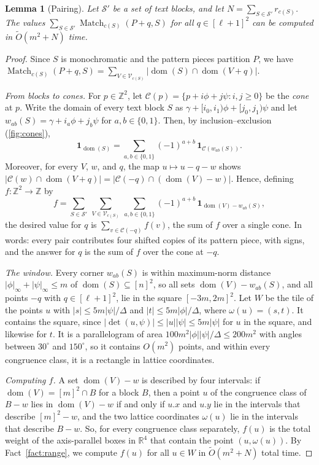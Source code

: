 \documentclass[11pt]{article}
\newtheorem{lemma}[theorem]{Lemma}
\theoremstyle{definition}
\newcommand{\Z}{\mathbb{Z}}
\newcommand{\R}{\mathbb{R}}
\newcommand{\tO}{\tilde{O}}
\renewcommand{\O}{O}
\DeclareMathOperator{\Match}{Match}
\DeclareMathOperator{\dom}{dom}
\newcommand{\cS}{\mathcal{S}}
\newcommand{\cV}{\mathcal{V}}
\newcommand{\cC}{\mathcal{C}}
\newcommand{\abs}[1]{\lvert #1 \rvert}
\newcommand{\inorm}[1]{\lvert #1 \rvert_\infty}
\newcommand{\x}[1]{#1.x}
\newcommand{\y}[1]{#1.y}
\begin{document}
\begin{lemma}[Pairing]\label{lem:pairing}
Let $\cS'$ be a set of text blocks, and let $N = \sum_{S \in \cS'} r_{c(S)}$.
The values $\sum_{S \in \cS'} \Match_{c(S)}(P + q, S)$ for all $q \in [\ell+1]^2$ can be computed in $\tO(m^2 + N)$ time.
\end{lemma}
\begin{proof}
Since $S$ is monochromatic and the pattern pieces partition $P$, we have $\Match_{c(S)}(P + q, S) = \sum_{V \in \cV_{c(S)}} \abs{\dom(S) \cap \dom(V+q)}$.

\emph{From blocks to cones.}
For $p \in \Z^2$, let $\cC(p) = \{p + i\phi + j\psi : i,j \ge 0\}$ be the \emph{cone} at $p$.
Write the domain of every text block $S$ as $\gamma + [i_0, i_1)\phi + [j_0, j_1)\psi$ and let $w_{ab}(S) = \gamma + i_a\phi + j_b\psi$ for $a,b \in \{0,1\}$.
Then, by inclusion--exclusion (\autoref{fig:cones}),
\[ \mathbf{1}_{\dom(S)} = \textstyle\sum_{a,b \in \{0,1\}} (-1)^{a+b}\,\mathbf 1_{\cC(w_{ab}(S))}. \]
Moreover, for every $V$, $w$, and $q$, the map $u \mapsto u - q - w$ shows $\abs{\cC(w) \cap \dom(V+q)} = \abs{\cC(-q) \cap (\dom(V) - w)}$.
Hence, defining $f \colon \Z^2 \to \Z$ by
\[ f = \sum_{S \in \cS'}\ \sum_{V \in \cV_{c(S)}}\ \sum_{a,b \in \{0,1\}} (-1)^{a+b}\,\mathbf{1}_{\dom(V) - w_{ab}(S)}, \]
the desired value for $q$ is $\sum_{v \in \cC(-q)} f(v)$, the sum of $f$ over a single cone.
In words: every pair contributes four shifted copies of its pattern piece, with signs, and the answer for $q$ is the sum of $f$ over the cone at $-q$.

\emph{The window.}
Every corner $w_{ab}(S)$ is within maximum-norm distance $\inorm{\phi} + \inorm{\psi} \le m$ of $\dom(S) \subseteq [n]^2$, so all sets $\dom(V) - w_{ab}(S)$, and all points $-q$ with $q \in [\ell+1]^2$, lie in the square $[-3m, 2m]^2$.
Let $W$ be the tile of the points $u$ with $\abs{s} \le 5m\abs{\psi}/\Delta$ and $\abs{t} \le 5m\abs{\phi}/\Delta$, where $\omega(u) = (s,t)$.
It contains the square, since $\abs{\det(u,\psi)} \le \abs{u}\abs{\psi} \le 5m\abs{\psi}$ for $u$ in the square, and likewise for $t$.
It is a parallelogram of area $100m^2\abs{\phi}\abs{\psi}/\Delta \le 200m^2$ with angles between $30^\circ$ and $150^\circ$, so it contains $\O(m^2)$ points, and within every congruence class, it is a rectangle in lattice coordinates.

\emph{Computing $f$.}
A set $\dom(V) - w$ is described by four intervals: if $\dom(V) = [m]^2 \cap B$ for a block $B$, then a point $u$ of the congruence class of $B - w$ lies in $\dom(V) - w$ if and only if $\x u$ and $\y u$ lie in the intervals that describe $[m]^2 - w$, and the two lattice coordinates $\omega(u)$ lie in the intervals that describe $B - w$.
So, for every congruence class separately, $f(u)$ is the total weight of the axis-parallel boxes in $\R^4$ that contain the point $(u, \omega(u))$.
By Fact~\ref{fact:range}, we compute $f(u)$ for all $u \in W$ in $\tO(m^2 + N)$ total time.


\end{proof}
\end{document}
